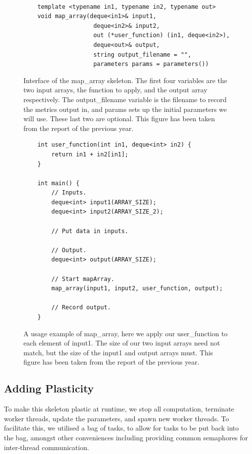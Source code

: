 \begin{figure}[H]
	\begin{lstlisting}

	template <typename in1, typename in2, typename out>
	void map_array(deque<in1>& input1, 
				   	deque<in2>& input2, 
				   	out (*user_function) (in1, deque<in2>), 
				   	deque<out>& output, 
				   	string output_filename = "", 
				   	parameters params = parameters())

	\end{lstlisting}

	\caption{Interface of the map\_array skeleton. The first four variables are the two input arrays, the function to apply, and the output array respectively. The output\_filename variable is the filename to record the metrics output in, and params sets up the initial parameters we will use. These last two are optional. This figure has been taken from the report of the previous year.}
	\label{fig:implementation_map_array_interface}
\end{figure}



\begin{figure}[H]
	\begin{lstlisting}
	int user_function(int in1, deque<int> in2) {
		return in1 + in2[in1];
	}

	int main() {
		// Inputs.
		deque<int> input1(ARRAY_SIZE);
		deque<int> input2(ARRAY_SIZE_2);

		// Put data in inputs.

		// Output.
		deque<int> output(ARRAY_SIZE);

		// Start mapArray.
		map_array(input1, input2, user_function, output);

		// Record output.
	}
	\end{lstlisting}

	\caption{A usage example of map\_array, here we apply our user\_function to each element of input1. The size of our two input arrays need not match, but the size of the input1 and output arrays must. This figure has been taken from the report of the previous year.}
	\label{fig:implementation_map_array_usage_example}
\end{figure}



\subsection{Adding Plasticity}
\label{section:implementation:adding_plasticity}
To make this skeleton plastic at runtime, we stop all computation, terminate worker threads, update the parameters, and spawn new worker threads. To facilitate this, we utilised a bag of tasks, to allow for tasks to be put back into the bag, amongst other conveniences including providing common semaphores for inter-thread communication.


